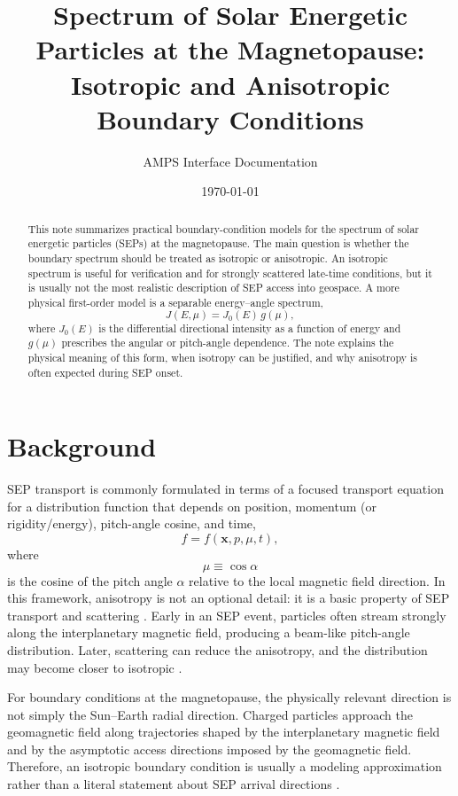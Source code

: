 \documentclass[11pt]{article}
\title{Spectrum of Solar Energetic Particles at the Magnetopause: Isotropic and Anisotropic Boundary Conditions}
\author{AMPS Interface Documentation}
\date{\today}
\begin{document}
\maketitle

\begin{abstract}
This note summarizes practical boundary-condition models for the spectrum of solar energetic particles (SEPs) at the magnetopause. The main question is whether the boundary spectrum should be treated as isotropic or anisotropic. An isotropic spectrum is useful for verification and for strongly scattered late-time conditions, but it is usually not the most realistic description of SEP access into geospace. A more physical first-order model is a separable energy--angle spectrum,
\begin{equation}
J(E,\mu)=J_0(E)\,g(\mu),
\end{equation}
where $J_0(E)$ is the differential directional intensity as a function of energy and $g(\mu)$ prescribes the angular or pitch-angle dependence. The note explains the physical meaning of this form, when isotropy can be justified, and why anisotropy is often expected during SEP onset.
\end{abstract}

\section{Background}
SEP transport is commonly formulated in terms of a focused transport equation for a distribution function that depends on position, momentum (or rigidity/energy), pitch-angle cosine, and time,
\begin{equation}
 f = f(\mathbf{x},p,\mu,t),
\end{equation}
where
\begin{equation}
 \mu \equiv \cos\alpha
\end{equation}
is the cosine of the pitch angle $\alpha$ relative to the local magnetic field direction. In this framework, anisotropy is not an optional detail: it is a basic property of SEP transport and scattering \cite{Kubo2015,Desai2016}. Early in an SEP event, particles often stream strongly along the interplanetary magnetic field, producing a beam-like pitch-angle distribution. Later, scattering can reduce the anisotropy, and the distribution may become closer to isotropic \cite{Desai2016,Davis2024}.

For boundary conditions at the magnetopause, the physically relevant direction is not simply the Sun--Earth radial direction. Charged particles approach the geomagnetic field along trajectories shaped by the interplanetary magnetic field and by the asymptotic access directions imposed by the geomagnetic field. Therefore, an isotropic boundary condition is usually a modeling approximation rather than a literal statement about SEP arrival directions \cite{Desai2016,Larsen2023}.
\end{document}
